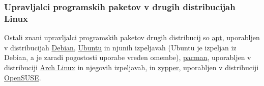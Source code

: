 \subsubsection{Upravljalci programskih paketov v drugih distribucijah Linux}

Ostali znani upravljalci programskih paketov drugih distribucij so
\href{https://ubuntu.com/server/docs/package-management}{apt}, uporabljen v distribucijah
\href{https://www.debian.org/}{Debian}, \href{https://ubuntu.com/}{Ubuntu} in njunih izpeljavah (Ubuntu je izpeljan iz
Debian, a je zaradi pogostosti uporabe vreden omembe), \href{https://wiki.archlinux.org/title/pacman}{pacman},
uporabljen v distribuciji \href{https://archlinux.org/}{Arch Linux} in njegovih izpeljavah, in
\href{https://en.opensuse.org/Portal:Zypper}{zypper}, uporabljen v distribuciji
\href{https://www.opensuse.org/}{OpenSUSE}.